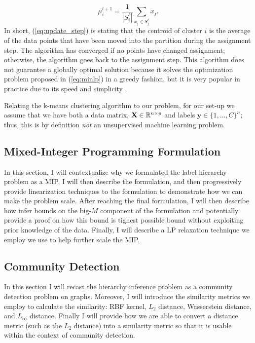 \documentclass[../thesis.tex]{subfiles}
\begin{document}
\begin{equation}
    \label{eq:update_step}
    \mu_i^{t+1} = \frac{1}{|S_i^t|} \sum_{x_j \in S_j^t} x_j.
\end{equation}
In short, (\ref{eq:update_step}) is stating that the centroid of cluster $i$ is the average of the data points that have been moved into the partition during the assignment step. The algorithm has converged if no points have changed assignment; otherwise, the algorithm goes back to the assignment step. This algorithm does not guarantee a globally optimal solution because it solves the optimization problem proposed in (\ref{eq:minlp}) in a greedy fashion, but it is very popular in practice due to its speed and simplicity \cite{hartigan1979algorithm} \cite{jain2010data}.

Relating the k-means clustering algorithm to our problem, for our set-up we assume that we have both a data matrix, $\mathbf{X} \in \mathbb{R}^{n \times p}$ and labels $\mathbf{y} \in \{1, \ldots, C\}^n$; thus, this is by definition \textit{not} an unsupervised machine learning problem.

\subsection{Mixed-Integer Programming Formulation}
In this section, I will contextualize why we formulated the label hierarchy problem as a MIP, I will then describe the formulation, and then progressively provide linearization techniques to the formulation to demonstrate how we can make the problem scale. After reaching the final formulation, I will then describe how infer bounds on the big-$M$ component of the formulation and potentially provide a proof on how this bound is tighest possible bound without exploiting prior knowledge of the data. Finally, I will describe a LP relaxation technique we employ we use to help further scale the MIP.

\subsection{Community Detection}
In this section I will recast the hierarchy inference problem as a community detection problem on graphs. Moreover, I will introduce the similarity metrics we employ to calculate the similarity: RBF kernel, $L_2$ distance, Wasserstein distance, and $L_\infty$ distance. Finally I will provide how we are able to convert a distance metric (such as the $L_2$ distance) into a similarity metric so that it is usable within the context of community detection.
\end{document}
